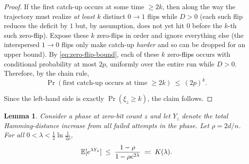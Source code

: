 \documentclass[lettersize,journal]{IEEEtran}
\newcommand{\new}[1]{\textcolor{black}{#1}}
\newcommand{\rerev}[1]{\textcolor{black}{#1}}
\newcommand{\EE}{\mathbb{E}}
\newtheorem{lemma}{Lemma}
\begin{document}
{\begin{proof}
	\smallskip
	If the first catch-up occurs at some time $\ge 2k$, then along the way the trajectory must realize \emph{at least $k$} distinct $0\!\to 1$ flips while $D>0$ (each such flip reduces the deficit by $1$ but, by assumption, does not yet hit $0$ before the $k$-th such zero\new{-flip}). Expose these $k$ zero-flips in order and ignore everything else (the interspersed $1\!\to 0$ flips only make catch-up \emph{harder} and so can be dropped for an upper bound). By \rerev{\eqref{eq:zero-flip-bound}}, each of these $k$ zero\new{-flips} occurs with conditional probability at most $2p$, uniformly over the entire run while $D>0$. Therefore, by the chain rule,
	\[
	\Pr(\text{first catch-up occurs at time }\ge 2k)\ \le\ (2p)^k.
	\]
	
	
	Since the left-hand side is exactly $\Pr(\xi_z\ge k)$, the claim follows.
\end{proof}


\setcounter{lemma}{5}
\begin{lemma}%
	Consider a phase at zero-bit count $z$ and let $Y_z$ denote the total 
	Hamming-distance increase from all failed attempts in the phase.  
	Let $\rho = 2d/n$.  
	For all $0<\lambda<\tfrac12\ln\frac{1}{2\rho}$,
	\[
	\EE[e^{\lambda Y_z}] 
	\;\le\; 
	\textcolor{black}{\frac{1-\rho}{1-\rho e^{2\lambda}}
	\;\eqqcolon\; K(\lambda).}
	\]
\end{lemma}

}
\end{document}
